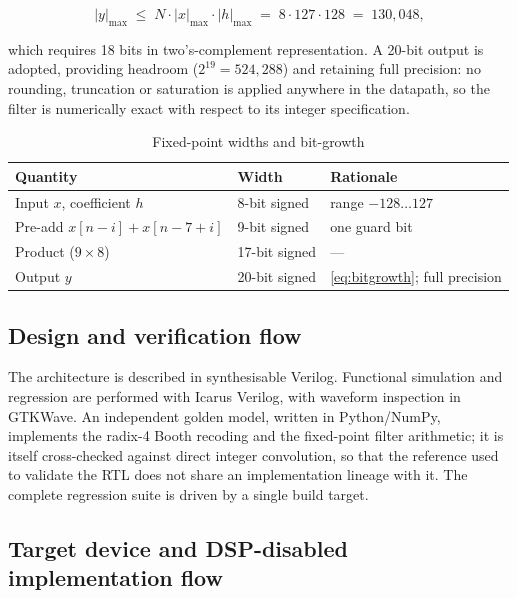 \documentclass[conference]{IEEEtran}
\begin{document}
\begin{equation}
|y|_{\max} \;\le\; N \cdot |x|_{\max} \cdot |h|_{\max}
          \;=\; 8 \cdot 127 \cdot 128 \;=\; 130{,}048 ,
\label{eq:bitgrowth}
\end{equation}

\noindent which requires 18 bits in two's-complement representation. A
20-bit output is adopted, providing headroom
($2^{19} = 524{,}288$) and retaining full precision: no rounding,
truncation or saturation is applied anywhere in the datapath, so the
filter is numerically exact with respect to its integer specification.

\begin{table}[t]
\caption{Fixed-point widths and bit-growth}
\label{tab:widths}
\centering
\begin{tabular}{@{}lll@{}}
\toprule
\textbf{Quantity} & \textbf{Width} & \textbf{Rationale} \\
\midrule
Input $x$, coefficient $h$ & 8-bit signed & range $-128 \dots 127$ \\
Pre-add $x[n-i]+x[n-7+i]$  & 9-bit signed & one guard bit \\
Product ($9 \times 8$)     & 17-bit signed & --- \\
Output $y$                 & 20-bit signed & \eqref{eq:bitgrowth}; full precision \\
\bottomrule
\end{tabular}
\end{table}

\subsection{Design and verification flow}

The architecture is described in synthesisable Verilog. Functional
simulation and regression are performed with Icarus Verilog, with
waveform inspection in GTKWave. An independent golden model, written in
Python/NumPy, implements the radix-4 Booth recoding and the fixed-point
filter arithmetic; it is itself cross-checked against direct integer
convolution, so that the reference used to validate the RTL does not
share an implementation lineage with it. The complete regression suite
is driven by a single build target.

\subsection{Target device and DSP-disabled implementation flow}
\end{document}
